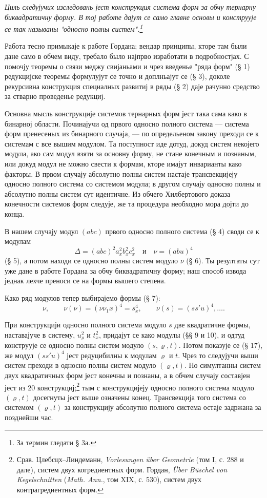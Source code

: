 ﻿\documentclass[11pt]{article}
\begin{document}
{\itshape Циль следујучих изследовань јест конструкция система форм за обчу тернарну биквадратичну форму. В тој работе дајут се само главне основы и конструује се так называны "односно полны систем".\footnote{За термин гледати § 3а.}}

Работа тесно примыкаје к работе Гордана; вендар принципы, кторе там были дане само в обчем виду, требало было најпрво изработати в подробностјах. С помочју теоремы о связи меджу свијаньами и чрез введенье "ряда форм" (§ 1) редукцијске теоремы формулујут се точно и доплньајут се (§ 3), доколе рекурсивна конструкция специалных развитиј в ряды (§ 2) даје рачунно средство за стварно проведенье редукциј.

Основна мысль конструкције системов тернарных форм јест така сама како в бинарној области. Починајучи од првого односно полного система --- система форм пренесеных из бинарного случаја, --- по определьеном закону преходи се к системам с все вышим модулом. Та поступност иде дотуд, докуд систем некојего модула, ако сам модул взяти за основну форму, не стане конечным и познаным, или докуд модул не можно свести к формам, кторе имајут инварианты како факторы. В првом случају абсолутно полны систем настаје трансвекцијеју односно полного система со системом модула; в другом случају односно полны и абсолутно полны систем сут идентичне. Из обчего Хилбертового доказа конечности системов форм следује, же та процедура необходно мора дојти до конца.

В нашем случају модул $(abc)$ првого односно полного система (§ 4) своди се к модулам
\[
\Delta=(abc)^2a_x^2b_x^2c_x^2\quad\text{и}\quad \nu=(abu)^4
\]
(§ 5), а потом находи се односно полны систем модуло $\nu$ (§ 6). Ты резултаты сут уже дане в работе Гордана за обчу биквадратичну форму; наш способ извода једнак лехче преноси се на формы вышего степена.

Како ряд модулов тепер выбирајемо формы (§ 7):
\[
\nu,\qquad \nu(\nu)=(\nu\nu_1x)^4=s_x^4,\qquad \nu(s)=(ss'u)^4,\ldots .
\]

При конструкцији односно полного система модуло $s$ две квадратичне формы, наставајуче в систему, $u_\varrho^2$ и $t_x^2$, придајут се како модулы (§§ 9 и 10), и одтуд конструује се односно полны систем модуло $(s,\varrho,t)$. Потом показује се (§ 17), же модул $(ss'u)^4$ јест редуцибилны к модулам $\varrho$ и $t$. Чрез то следујучи выши систем преходи в односно полны систем модуло $(\varrho,t)$. Но симултанны систем двух квадратичных форм јест конечны и познаны, а в обчем случају составјен јест из 20 конструкциј;\footnote{Срав. Цлебсцх--Линдеманн, \emph{Vorlesungen über Geometrie} (том I, с. 288 и дале), систем двух когредиентных форм. Гордан, \emph{Über Büschel von Kegelschnitten} (\emph{Math. Ann.}, том XIX, с. 530), систем двух контрагредиентных форм.}
тым с конструкцијеју односно полного система модуло $(\varrho,t)$ досегнуты јест выше означены конец. Трансвекција того система со системом $(\varrho,t)$ за конструкцију абсолутно полного система остаје задржана за позднейши час.
\end{document}
